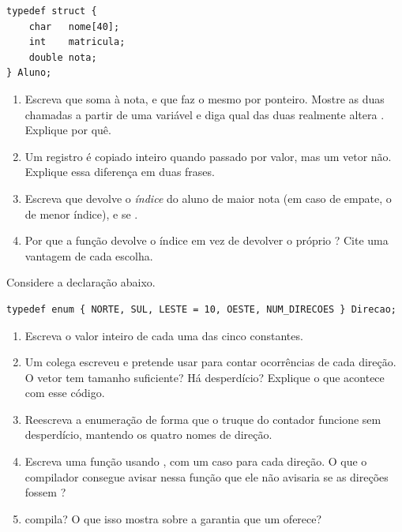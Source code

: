 \documentclass[11pt,a4paper]{article}
\begin{document}
\begin{lstlisting}
typedef struct {
    char   nome[40];
    int    matricula;
    double nota;
} Aluno;
\end{lstlisting}

\begin{enumerate}[label=(\alph*),leftmargin=1.8em,itemsep=1pt]
  \item Escreva  que soma  à nota, e
         que faz o mesmo por ponteiro.
        Mostre as duas chamadas a partir de uma variável  e diga qual
        das duas realmente altera . Explique por quê.
  \item Um registro é copiado inteiro quando passado por valor, mas um vetor não.
        Explique essa diferença em duas frases.
  \item Escreva  que devolve o \emph{índice}
        do aluno de maior nota (em caso de empate, o de menor índice), e
         se .
  \item Por que a função devolve o índice em vez de devolver o próprio ?
        Cite uma vantagem de cada escolha.
\end{enumerate}

Considere a declaração abaixo.

\begin{lstlisting}
typedef enum { NORTE, SUL, LESTE = 10, OESTE, NUM_DIRECOES } Direcao;
\end{lstlisting}

\begin{enumerate}[label=(\alph*),leftmargin=1.8em,itemsep=1pt]
  \item Escreva o valor inteiro de cada uma das cinco constantes.
  \item Um colega escreveu  e pretende usar
         para contar ocorrências de cada direção. O vetor tem
        tamanho suficiente? Há desperdício? Explique o que acontece com esse código.
  \item Reescreva a enumeração de forma que o truque do contador funcione sem
        desperdício, mantendo os quatro nomes de direção.
  \item Escreva uma função  usando ,
        com um caso para cada direção. O que o compilador consegue avisar nessa
        função que ele não avisaria se as direções fossem ?
  \item {} compila? O que isso mostra sobre a garantia que um
         oferece?
\end{enumerate}
\end{document}

